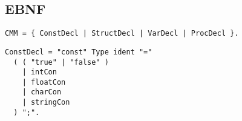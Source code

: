 
\subsection{EBNF}

\begin{lstlisting}[language=EBNF]
CMM	= { ConstDecl | StructDecl | VarDecl | ProcDecl }.
\end{lstlisting}

\begin{lstlisting}[language=EBNF]
ConstDecl = "const" Type ident "=" 
  ( ( "true" | "false" ) 
    | intCon
    | floatCon
    | charCon
    | stringCon
  ) ";".
\end{lstlisting}
